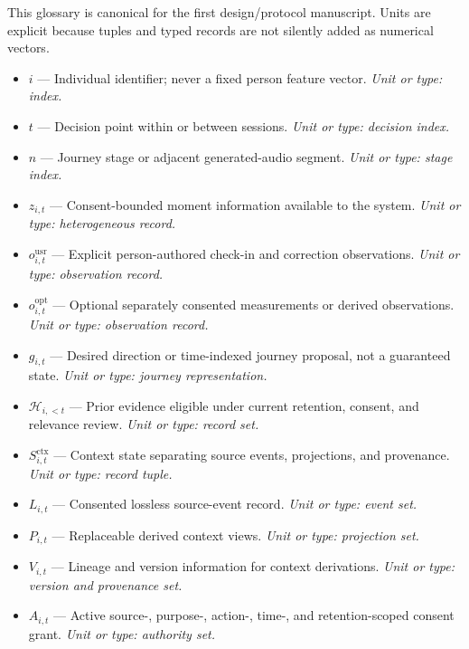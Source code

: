 
\noindent This glossary is canonical for the first design/protocol manuscript. Units are explicit because tuples and typed records are not silently added as numerical vectors.

\begin{itemize}[leftmargin=1.35em,itemsep=0.52em]
  \item ${i}$ --- Individual identifier; never a fixed person feature vector. \textit{Unit or type: index.}
  \item ${t}$ --- Decision point within or between sessions. \textit{Unit or type: decision index.}
  \item ${n}$ --- Journey stage or adjacent generated-audio segment. \textit{Unit or type: stage index.}
  \item ${z_{i,t}}$ --- Consent-bounded moment information available to the system. \textit{Unit or type: heterogeneous record.}
  \item ${o^{\mathrm{usr}}_{i,t}}$ --- Explicit person-authored check-in and correction observations. \textit{Unit or type: observation record.}
  \item ${o^{\mathrm{opt}}_{i,t}}$ --- Optional separately consented measurements or derived observations. \textit{Unit or type: observation record.}
  \item ${g_{i,t}}$ --- Desired direction or time-indexed journey proposal, not a guaranteed state. \textit{Unit or type: journey representation.}
  \item ${\mathcal{H}_{i,<t}}$ --- Prior evidence eligible under current retention, consent, and relevance review. \textit{Unit or type: record set.}
  \item ${S^{\mathrm{ctx}}_{i,t}}$ --- Context state separating source events, projections, and provenance. \textit{Unit or type: record tuple.}
  \item ${L_{i,t}}$ --- Consented lossless source-event record. \textit{Unit or type: event set.}
  \item ${P_{i,t}}$ --- Replaceable derived context views. \textit{Unit or type: projection set.}
  \item ${V_{i,t}}$ --- Lineage and version information for context derivations. \textit{Unit or type: version and provenance set.}
  \item ${A_{i,t}}$ --- Active source-, purpose-, action-, time-, and retention-scoped consent grant. \textit{Unit or type: authority set.}

\end{itemize}

